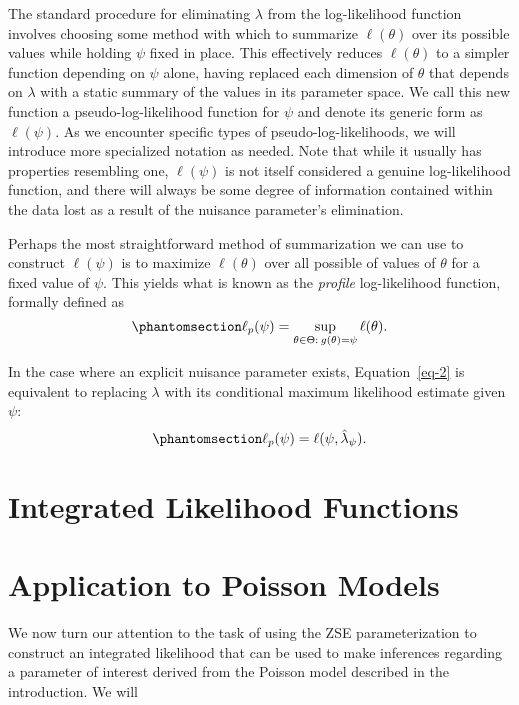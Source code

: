 \documentclass[
  12pt]{article}
\begin{document}
The standard procedure for eliminating \(\lambda\) from the
log-likelihood function involves choosing some method with which to
summarize \(\ell(\theta)\) over its possible values while holding
\(\psi\) fixed in place. This effectively reduces \(\ell(\theta)\) to a
simpler function depending on \(\psi\) alone, having replaced each
dimension of \(\theta\) that depends on \(\lambda\) with a static
summary of the values in its parameter space. We call this new function
a pseudo-log-likelihood function for \(\psi\) and denote its generic
form as \(\ell(\psi)\). As we encounter specific types of
pseudo-log-likelihoods, we will introduce more specialized notation as
needed. Note that while it usually has properties resembling one,
\(\ell(\psi)\) is not itself considered a genuine log-likelihood
function, and there will always be some degree of information contained
within the data lost as a result of the nuisance parameter's
elimination.

Perhaps the most straightforward method of summarization we can use to
construct \(\ell(\psi)\) is to maximize \(\ell(\theta)\) over all
possible of values of \(\theta\) for a fixed value of \(\psi\). This
yields what is known as the \emph{profile} log-likelihood function,
formally defined as \begin{equation}\phantomsection\label{eq-2}{
\ell_p(\psi) = \sup_{\theta \in \Theta: \> g(\theta) = \psi} \ell(\theta).
}\end{equation}

In the case where an explicit nuisance parameter exists,
Equation~\ref{eq-2} is equivalent to replacing \(\lambda\) with its
conditional maximum likelihood estimate given \(\psi\):
\begin{equation}\phantomsection\label{eq-2}{
\ell_p(\psi) = \ell(\psi, \hat{\lambda}_{\psi}).
}\end{equation}

\section{Integrated Likelihood
Functions}\label{integrated-likelihood-functions}

\section{Application to Poisson
Models}\label{application-to-poisson-models}

We now turn our attention to the task of using the ZSE parameterization
to construct an integrated likelihood that can be used to make
inferences regarding a parameter of interest derived from the Poisson
model described in the introduction. We will
\end{document}
